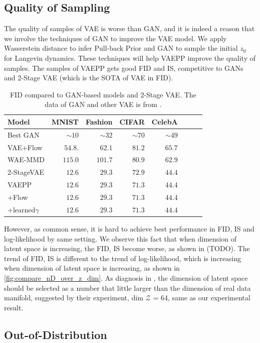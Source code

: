 \subsection{Quality of Sampling}
The quality of samples of VAE is worse than GAN, and it is indeed a reason that we involve the techniques of GAN to improve the VAE model. We apply Wasserstein distance to infer Pull-back Prior and GAN to sample the initial $z_0$ for Langevin dynamics. These techniques will help VAEPP improve the quality of samples. The samples of VAEPP gets good FID and IS, competitive to GANs and 2-Stage VAE (which is the SOTA of VAE in FID). 
\begin{table}[tb]
\centering
\begin{tabular}{lrrrrrrr}  
\toprule
Model & MNIST & Fashion & CIFAR & CelebA\\
\midrule
Best GAN   & $\sim10$& $\sim32$&$\sim70$& $\sim49$\\
VAE+Flow   & $54.8$. & $62.1$  & $81.2$ & $65.7$\\
WAE-MMD    & $115.0$ & $101.7$ & $80.9$ & $62.9$\\
2-StageVAE & $12.6$  & $29.3$  & $72.9$ & $44.4$\\
VAEPP      & $12.6$  & $29.3$  & $71.3$ & $44.4$ \\
\quad +Flow      & $12.6$  & $29.3$  & $71.3$ & $44.4$ \\
\quad +learned$\gamma$  & $12.6$  & $29.3$  & $71.3$ & $44.4$ \\
\bottomrule
\end{tabular}
\caption{FID compared to GAN-based models and 2-Stage VAE. The data of GAN and other VAE is from \protect\cite{dai2019diagnosing}. }
\label{tab:compare_FID}
\end{table}
However, as common sense, it is hard to achieve best performance in FID, IS and log-likelihood by same setting. We observe this fact that when dimension of latent space is increasing, the FID, IS become worse, as shown in (TODO). The trend of FID, IS is different to the trend of log-likelihood, which is increasing when dimension of latent space is increasing, as shown in \cref{fig:compare_nD_over_z_dim}. As diagnosis in \cite{dai2019diagnosing}, the dimension of latent space should be selected as a number that little larger than the dimension of real data manifold, suggested by their experiment, dim $\mathcal{Z}$ = 64, same as our experimental result.  

\subsection{Out-of-Distribution}

